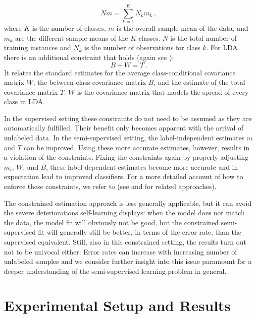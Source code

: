 \documentclass[twoside]{memoir}\usepackage[]{graphicx}\usepackage{xcolor}
\begin{document}
\begin{equation}\label{eq:altlaw}
N m = \sum_{k=1}^K N_k m_k \, ,
\end{equation}
where $K$ is the number of classes, $m$ is the overall sample mean of the data, and $m_k$ are the different sample means of the $K$ classes.  $N$ is the total number of training instances and $N_k$ is the number of observations for class $k$.  For LDA there is an additional constraint that holds (again see \citet{fukunaga90}):
\begin{equation}\label{eq:cov}
 B + W = T \, .
\end{equation}
It relates the standard estimates for the average class-conditional covariance matrix $W$, the between-class covariance matrix $B$, and the estimate of the total covariance matrix $T$.  $W$ is the covariance matrix that models the spread of every class in LDA.

In the supervised setting these constraints do not need to be assumed as they are automatically fulfilled.  Their benefit only becomes apparent with the arrival of unlabeled data. In the semi-supervised setting, the label-independent estimates $m$ and $T$ can be improved.  Using these more accurate estimates, however, results in a violation of the constraints. Fixing the constraints again by properly adjusting $m_i$, $W$, and $B$, these label-dependent estimates become more accurate and in expectation lead to improved classifiers.  For a more detailed account of how to enforce these constraints, we refer to \citet{Loog2014a} (see \citet{Krijthe2014} and \citet{Loog2012b} for related approaches).

The constrained estimation approach is less generally applicable, but it can avoid the severe deteriorations self-learning displays: when the model does not match the data, the model fit will obviously not be good, but the constrained semi-supervised fit will generally still be better, in terms of the error rate, than the supervised equivalent.  Still, also in this constrained setting, the results turn out not to be univocal either.  Error rates can increase with increasing number of unlabeled samples and we consider further insight into this issue paramount for a deeper understanding of the semi-supervised learning problem in general.




\section{Experimental Setup and Results}\label{sect:exp}
\end{document}
